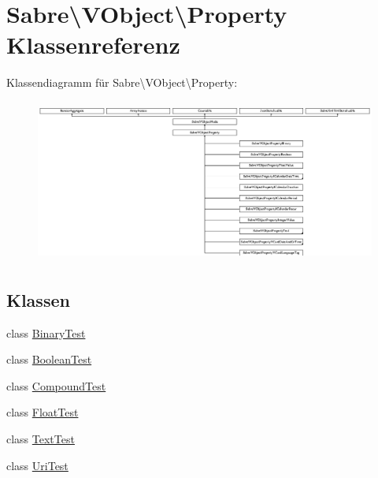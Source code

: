 \hypertarget{class_sabre_1_1_v_object_1_1_property}{}\section{Sabre\textbackslash{}V\+Object\textbackslash{}Property Klassenreferenz}
\label{class_sabre_1_1_v_object_1_1_property}
Klassendiagramm für Sabre\textbackslash{}V\+Object\textbackslash{}Property\+:\begin{figure}[H]
\begin{center}
\leavevmode
\includegraphics[height=5.369863cm]{class_sabre_1_1_v_object_1_1_property}
\end{center}
\end{figure}
\subsection*{Klassen}
\begin{DoxyCompactItemize}
\item 
class \mbox{\hyperlink{class_sabre_1_1_v_object_1_1_property_1_1_binary_test}{Binary\+Test}}
\item 
class \mbox{\hyperlink{class_sabre_1_1_v_object_1_1_property_1_1_boolean_test}{Boolean\+Test}}
\item 
class \mbox{\hyperlink{class_sabre_1_1_v_object_1_1_property_1_1_compound_test}{Compound\+Test}}
\item 
class \mbox{\hyperlink{class_sabre_1_1_v_object_1_1_property_1_1_float_test}{Float\+Test}}
\item 
class \mbox{\hyperlink{class_sabre_1_1_v_object_1_1_property_1_1_text_test}{Text\+Test}}
\item 
class \mbox{\hyperlink{class_sabre_1_1_v_object_1_1_property_1_1_uri_test}{Uri\+Test}}
\end{DoxyCompactItemize}
